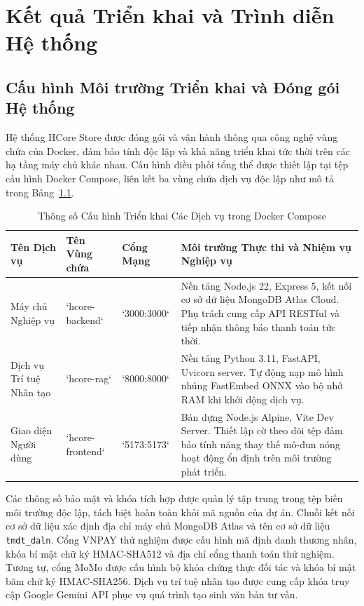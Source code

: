 \chapter{Kết quả Triển khai và Trình diễn Hệ thống}

\section{Cấu hình Môi trường Triển khai và Đóng gói Hệ thống}
Hệ thống HCore Store được đóng gói và vận hành thông qua công nghệ vùng chứa của Docker, đảm bảo tính độc lập và khả năng triển khai tức thời trên các hạ tầng máy chủ khác nhau. Cấu hình điều phối tổng thể được thiết lập tại tệp cấu hình Docker Compose, liên kết ba vùng chứa dịch vụ độc lập như mô tả trong Bảng~\ref{tab:docker_services}.

\begin{table}[H]
\centering
\caption{Thông số Cấu hình Triển khai Các Dịch vụ trong Docker Compose}
\label{tab:docker_services}
\begin{tabularx}{\textwidth}{p{2.8cm}p{3cm}p{2.2cm}X}
\toprule
\textbf{Tên Dịch vụ} & \textbf{Tên Vùng chứa} & \textbf{Cổng Mạng} & \textbf{Môi trường Thực thi và Nhiệm vụ Nghiệp vụ} \\
\midrule
Máy chủ Nghiệp vụ & `hcore-backend` & `3000:3000` & Nền tảng Node.js 22, Express 5, kết nối cơ sở dữ liệu MongoDB Atlas Cloud. Phụ trách cung cấp API RESTful và tiếp nhận thông báo thanh toán tức thời. \\
\addlinespace
Dịch vụ Trí tuệ Nhân tạo & `hcore-rag` & `8000:8000` & Nền tảng Python 3.11, FastAPI, Uvicorn server. Tự động nạp mô hình nhúng FastEmbed ONNX vào bộ nhớ RAM khi khởi động dịch vụ. \\
\addlinespace
Giao diện Người dùng & `hcore-frontend` & `5173:5173` & Bản dựng Node.js Alpine, Vite Dev Server. Thiết lập cờ theo dõi tệp đảm bảo tính năng thay thế mô-đun nóng hoạt động ổn định trên môi trường phát triển. \\
\bottomrule
\end{tabularx}
\end{table}

Các thông số bảo mật và khóa tích hợp được quản lý tập trung trong tệp biến môi trường độc lập, tách biệt hoàn toàn khỏi mã nguồn của dự án. Chuỗi kết nối cơ sở dữ liệu xác định địa chỉ máy chủ MongoDB Atlas và tên cơ sở dữ liệu \texttt{tmdt\_daln}. Cổng VNPAY thử nghiệm được cấu hình mã định danh thương nhân, khóa bí mật chữ ký HMAC-SHA512 và địa chỉ cổng thanh toán thử nghiệm. Tương tự, cổng MoMo được cấu hình bộ khóa chứng thực đối tác và khóa bí mật băm chữ ký HMAC-SHA256. Dịch vụ trí tuệ nhân tạo được cung cấp khóa truy cập Google Gemini API phục vụ quá trình tạo sinh văn bản tư vấn.

